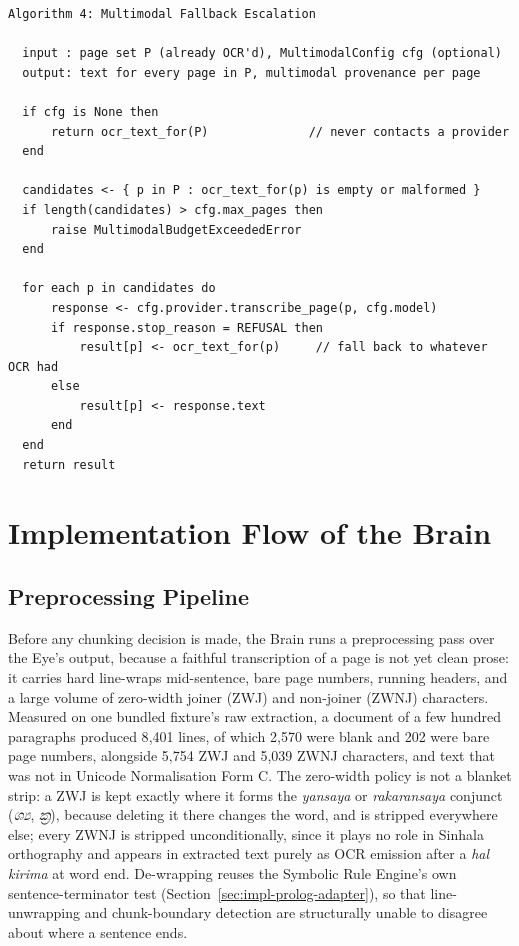 \documentclass[12pt,a4paper,oneside]{report}
\begin{document}
\begin{verbatim}
Algorithm 4: Multimodal Fallback Escalation

  input : page set P (already OCR'd), MultimodalConfig cfg (optional)
  output: text for every page in P, multimodal provenance per page

  if cfg is None then
      return ocr_text_for(P)              // never contacts a provider
  end

  candidates <- { p in P : ocr_text_for(p) is empty or malformed }
  if length(candidates) > cfg.max_pages then
      raise MultimodalBudgetExceededError
  end

  for each p in candidates do
      response <- cfg.provider.transcribe_page(p, cfg.model)
      if response.stop_reason = REFUSAL then
          result[p] <- ocr_text_for(p)     // fall back to whatever OCR had
      else
          result[p] <- response.text
      end
  end
  return result
\end{verbatim}

\section{Implementation Flow of the Brain}
\label{sec:impl-brain}

\subsection{Preprocessing Pipeline}
\label{sec:impl-preprocess}
Before any chunking decision is made, the Brain runs a preprocessing pass over the Eye's output, because a faithful transcription of a page is not yet clean prose: it carries hard line-wraps mid-sentence, bare page numbers, running headers, and a large volume of zero-width joiner (ZWJ) and non-joiner (ZWNJ) characters. Measured on one bundled fixture's raw extraction, a document of a few hundred paragraphs produced 8{,}401 lines, of which 2{,}570 were blank and 202 were bare page numbers, alongside 5{,}754 ZWJ and 5{,}039 ZWNJ characters, and text that was not in Unicode Normalisation Form C. The zero-width policy is not a blanket strip: a ZWJ is kept exactly where it forms the \textit{yansaya} or \textit{rakaransaya} conjunct (\textit{ශ්‍ය}, \textit{ක්‍ර}), because deleting it there changes the word, and is stripped everywhere else; every ZWNJ is stripped unconditionally, since it plays no role in Sinhala orthography and appears in extracted text purely as OCR emission after a \textit{hal kirima} at word end. De-wrapping reuses the Symbolic Rule Engine's own sentence-terminator test (Section~\ref{sec:impl-prolog-adapter}), so that line-unwrapping and chunk-boundary detection are structurally unable to disagree about where a sentence ends.
\end{document}
